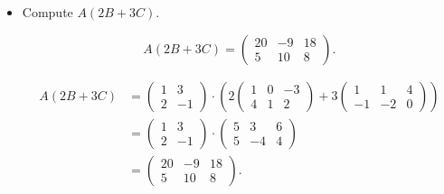 \begin{Exercise}
\begin{itemize}
\item Compute $A(2B+3C)$.
\begin{answer}
$$
A(2B+3C) = \begin{pmatrix}
20 & -9 & 18 \\
5 & 10 & 8
\end{pmatrix}.
$$
\end{answer}
\begin{solution}
\begin{align*}
A(2B+3C)
&= \begin{pmatrix}
1 & 3 \\
2 & -1
\end{pmatrix} \cdot \left( 2\begin{pmatrix}
1 & 0 & -3 \\
4 & 1 & 2
\end{pmatrix} + 3\begin{pmatrix}
1 & 1 & 4 \\
-1 & -2 & 0
\end{pmatrix} \right) \\
&= \begin{pmatrix}
1 & 3 \\
2 & -1
\end{pmatrix} \cdot \begin{pmatrix}
5 & 3 & 6 \\
5 & -4 & 4
\end{pmatrix} \\
&= \begin{pmatrix}
20 & -9 & 18 \\
5 & 10 & 8
\end{pmatrix}.
\end{align*}
\end{solution}


\end{itemize}
\end{Exercise}
